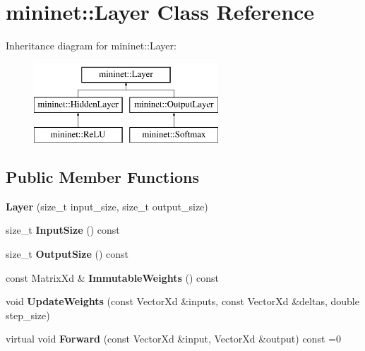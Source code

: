 \hypertarget{classmininet_1_1_layer}{}\section{mininet\+:\+:Layer Class Reference}
\label{classmininet_1_1_layer}
Inheritance diagram for mininet\+:\+:Layer\+:\begin{figure}[H]
\begin{center}
\leavevmode
\includegraphics[height=3.000000cm]{classmininet_1_1_layer}
\end{center}
\end{figure}
\subsection*{Public Member Functions}
\begin{DoxyCompactItemize}
\item 
\hypertarget{classmininet_1_1_layer_aed25482510bfaf3ca2fbea9897ddb352}{}\label{classmininet_1_1_layer_aed25482510bfaf3ca2fbea9897ddb352} 
{\bfseries Layer} (size\+\_\+t input\+\_\+size, size\+\_\+t output\+\_\+size)
\item 
\hypertarget{classmininet_1_1_layer_a1e4d5bfdc7e78035d185e4a1a690d53b}{}\label{classmininet_1_1_layer_a1e4d5bfdc7e78035d185e4a1a690d53b} 
size\+\_\+t {\bfseries Input\+Size} () const
\item 
\hypertarget{classmininet_1_1_layer_a57a99b9937ce76a1a6e57903f308aba4}{}\label{classmininet_1_1_layer_a57a99b9937ce76a1a6e57903f308aba4} 
size\+\_\+t {\bfseries Output\+Size} () const
\item 
\hypertarget{classmininet_1_1_layer_a294ed3ba99229b383cf0486a5bbc67bb}{}\label{classmininet_1_1_layer_a294ed3ba99229b383cf0486a5bbc67bb} 
const Matrix\+Xd \& {\bfseries Immutable\+Weights} () const
\item 
\hypertarget{classmininet_1_1_layer_a1d0a6420b0bb4020dc08730e9447cf43}{}\label{classmininet_1_1_layer_a1d0a6420b0bb4020dc08730e9447cf43} 
void {\bfseries Update\+Weights} (const Vector\+Xd \&inputs, const Vector\+Xd \&deltas, double step\+\_\+size)
\item 
\hypertarget{classmininet_1_1_layer_a933df55c92eb813d3e69e9ecfa42dfa6}{}\label{classmininet_1_1_layer_a933df55c92eb813d3e69e9ecfa42dfa6} 
virtual void {\bfseries Forward} (const Vector\+Xd \&input, Vector\+Xd \&output) const =0
\end{DoxyCompactItemize}
